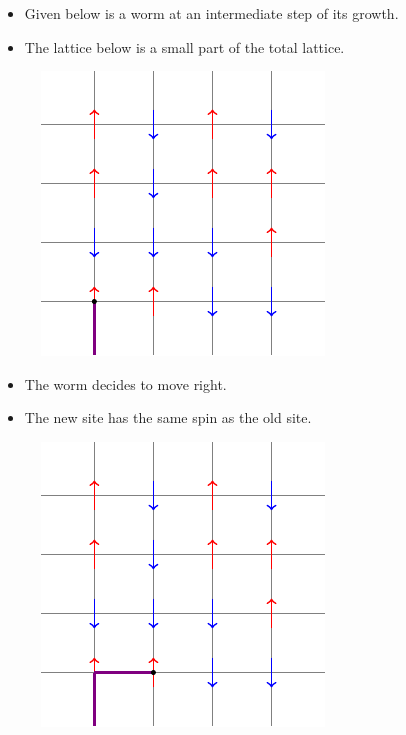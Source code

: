 \documentclass{beamer}
\begin{document}
\begin{frame}
\begin{itemize}
    \item Given below is a worm at an intermediate step of its growth.
    \item The lattice below is a small part of the total lattice.
\end{itemize}
\begin{figure}
    \centering
    \includegraphics{tikz1.pdf}
\end{figure}
\end{frame}

\begin{frame}
\begin{itemize}
    \item The worm decides to move right.
    \item The new site has the same spin as the old site.
\end{itemize}
\begin{figure}
    \centering
    \includegraphics{tikz2.pdf}
\end{figure}
\end{frame}
\end{document}
